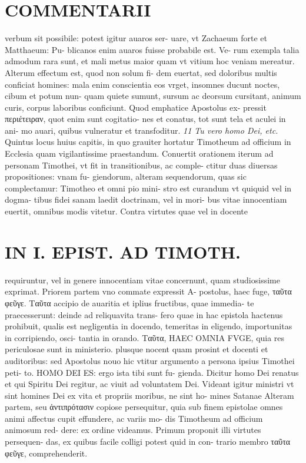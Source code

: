 \documentclass{article}
\begin{document}
\begin{pages}
\section*{COMMENTARII }
\marginpar{[ p.158 ]}\pstart verbum sit possibile: potest igitur auaros ser- uare, vt Zachaeum forte et Matthaeum: Pu- blicanos enim auaros fuisse probabile est. Ve- rum exempla talia admodum rara sunt, et mali metus maior quam vt vitium hoc veniam mereatur.  \pend\pstart Alterum effectum est, quod non solum fi- dem euertat, sed doloribus multis conficiat homines: mala enim conscientia eos vrget, insomnes ducunt noctes, cibum et potum nun- quam quiete sumunt, sursum ac deorsum cursitant, animum curis, corpus laboribus conficiunt. Quod emphatice Apostolus ex- pressit περιέτειραν, quot enim sunt cogitatio- nes et conatus, tot sunt tela et aculei in ani- mo auari, quibus vulneratur et transfoditur.  \pend
\textit{11 Tu vero homo Dei, etc. }\pstart Quintus locus huius capitis, in quo grauiter hortatur Timotheum ad officium in Ecclesia quam vigilantissime praestandum. Conuertit orationem iterum ad personam Timothei, vt fit in transitionibus, ac comple- ctitur duas diuersas propositiones: vnam fu- giendorum, alteram sequendorum, quas sic complectamur: Timotheo et omni pio mini- stro est curandum vt quiquid vel in dogma- tibus fidei sanam laedit doctrinam, vel in mori- bus vitae innocentiam euertit, omnibus modis vitetur. Contra virtutes quae vel in docente  \pend
\section*{IN I. EPIST. AD TIMOTH. }
\marginpar{[ p.159 ]}\pstart requiruntur, vel in genere innocentiam vitae concernunt, quam studiosissime exprimat. Priorem partem vno commate expressit A- postolus, haec fuge, ταῦτα φεῦγε. Ταῦτα accipio de auaritia et iplius fructibus, quae immedia- te praecesserunt: deinde ad reliquavita trans- fero quae in hac epistola hactenus prohibuit, qualis est negligentia in docendo, temeritas in eligendo, importunitas in corripiendo, osci- tantia in orando. Ταῦτα, HAEC OMNIA FVGE, quia res periculosae sunt in ministerio. plusque nocent quam prosint et docenti et auditoribus: sed Apostolus nouo hic vtitur argumento a persona ipsius Timothei peti- to. HOMO DEI ES: ergo ista tibi sunt fu- gienda. Dicitur homo Dei renatus et qui Spiritu Dei regitur, ac viuit ad voluntatem Dei.  \pend\pstart Videant igitur ministri vt sint homines Dei ex vita et propriis moribus, ne sint ho- mines Satanae  \pend\pstart Alteram partem, seu ἀντιπρότασιν copiose persequitur, quia sub finem epistolae omnes animi affectus cupit effundere, ac variis mo- dis Timotheum ad officium animosum red- dere: ex ordine videamus.  \pend\pstart Primum proponit illi virtutes persequen- das, ex quibus facile colligi potest quid in con- trario membro ταῦτα φεῦγε, comprehenderit.  \pend

\end{pages}
\end{document}
